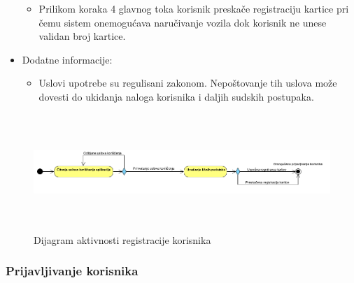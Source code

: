 \begin{itemize}
\begin{itemize}
            \item Prilikom koraka 4 glavnog toka korisnik preskače registraciju kartice pri čemu sistem onemogućava naručivanje vozila dok korisnik ne unese validan broj kartice.
        \end{itemize}
    \item Dodatne informacije:
        \begin{itemize}
            \item Uslovi upotrebe su regulisani zakonom. Nepoštovanje tih uslova može dovesti do ukidanja naloga korisnika i daljih sudskih postupaka.
        \end{itemize}
\end{itemize}

\begin{figure}[H]
\begin{center}
\includegraphics[width=480pt,height=125pt]{Slike/RegistracijaKorisnika.png}
\end{center}
    \caption{Dijagram aktivnosti registracije korisnika}
\label{fig:RegistracijaKorisnika}
\end{figure}

\subsubsection{\bfseries Prijavljivanje korisnika}

